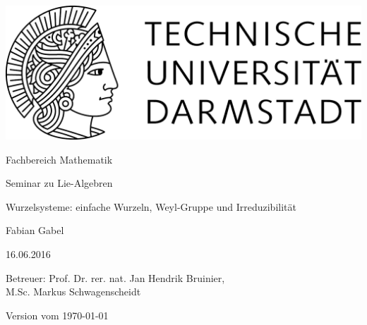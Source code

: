 \begin{titlepage}
  \begin{center}
    \vspace{1cm}
    \includegraphics[width=0.5\linewidth]{TU_Darmstadt_Logo.pdf}
    \vspace{12pt}
    
    \large{Fachbereich Mathematik}
    \vspace{2cm}
    
    \large{Seminar zu Lie-Algebren}
    \vspace{2cm}

    \huge{Wurzelsysteme: einfache Wurzeln, Weyl-Gruppe und Irreduzibilität}
    
    \vspace*{2cm}    
    
		\large
    Fabian Gabel
    \vspace*{.5cm}

    16.06.2016 \\
    \vspace*{1cm}

    Betreuer: Prof. Dr. rer. nat. Jan Hendrik Bruinier,  \\
    \hspace{0.6cm}M.Sc. Markus Schwagenscheidt

    \vspace*{.5cm}

    \tiny{Version vom \today}
  \end{center}
\end{titlepage}
\vspace*{\fill}
